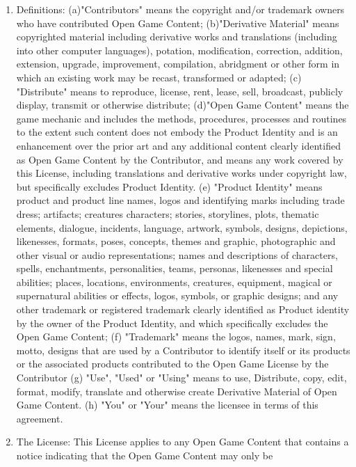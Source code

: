 \begin{enumerate}
\def\labelenumi{\arabic{enumi}.}
\item
  Definitions: (a)"Contributors" means the copyright and/or trademark
  owners who have contributed Open Game Content; (b)"Derivative
  Material" means copyrighted material including derivative works and
  translations (including into other computer languages), potation,
  modification, correction, addition, extension, upgrade, improvement,
  compilation, abridgment or other form in which an existing work may be
  recast, transformed or adapted; (c) "Distribute" means to reproduce,
  license, rent, lease, sell, broadcast, publicly display, transmit or
  otherwise distribute; (d)"Open Game Content" means the game mechanic
  and includes the methods, procedures, processes and routines to the
  extent such content does not embody the Product Identity and is an
  enhancement over the prior art and any additional content clearly
  identified as Open Game Content by the Contributor, and means any work
  covered by this License, including translations and derivative works
  under copyright law, but specifically excludes Product Identity. (e)
  "Product Identity" means product and product line names, logos and
  identifying marks including trade dress; artifacts; creatures
  characters; stories, storylines, plots, thematic elements, dialogue,
  incidents, language, artwork, symbols, designs, depictions,
  likenesses, formats, poses, concepts, themes and graphic, photographic
  and other visual or audio representations; names and descriptions of
  characters, spells, enchantments, personalities, teams, personas,
  likenesses and special abilities; places, locations, environments,
  creatures, equipment, magical or supernatural abilities or effects,
  logos, symbols, or graphic designs; and any other trademark or
  registered trademark clearly identified as Product identity by the
  owner of the Product Identity, and which specifically excludes the
  Open Game Content; (f) "Trademark" means the logos, names, mark, sign,
  motto, designs that are used by a Contributor to identify itself or
  its products or the associated products contributed to the Open Game
  License by the Contributor (g) "Use", "Used" or "Using" means to use,
  Distribute, copy, edit, format, modify, translate and otherwise create
  Derivative Material of Open Game Content. (h) "You" or "Your" means
  the licensee in terms of this agreement.
\item
  The License: This License applies to any Open Game Content that
  contains a notice indicating that the Open Game Content may only be

\end{enumerate}
